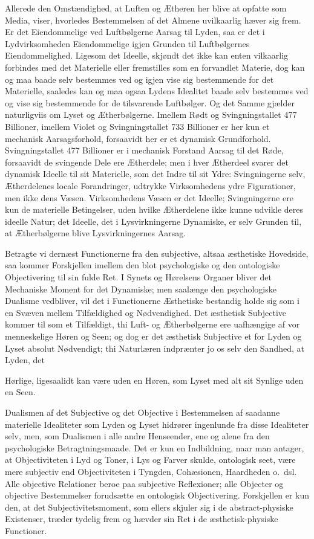 \documentclass[12pt]{book}
\newcommand{\opage}[1]{\marginnote{\footnotesize\textit{[#1]}}}
\begin{document}
Allerede den Omstændighed, at Luften og Ætheren her blive at opfatte som Media, viser,
hvorledes Bestemmelsen af det Almene uvilkaarlig hæver sig frem. Er det Eiendommelige ved
Luftbølgerne Aarsag til Lyden, saa er det i Lydvirksomheden Eiendommelige igjen Grunden til
Luftbølgernes
\opage{386} Eiendommelighed. Ligesom det Ideelle, skjøndt det ikke kan enten vilkaarlig forbindes med det
Materielle eller fremstilles som en forvandlet Materie, dog kan og maa baade selv bestemmes ved
og igjen vise sig bestemmende for det Materielle, saaledes kan og maa ogsaa Lydens Idealitet
baade selv bestemmes ved og vise sig bestemmende for de tilsvarende Luftbølger. Og det Samme
gjælder naturligviis om Lyset og Ætherbølgerne. Imellem Rødt og Svingningstallet 477 Billioner,
imellem Violet og Svingningstallet 733 Billioner er her kun et mechanisk Aarsagsforhold,
forsaavidt her er et dynamisk Grundforhold. Svingningstallet 477 Billioner er i mechanisk
Forstand Aarsag til det Røde, forsaavidt de svingende Dele ere Ætherdele; men i hver Ætherdeel
svarer det dynamisk Ideelle til sit Materielle, som det Indre til sit Ydre: Svingningerne selv,
Ætherdelenes locale Forandringer, udtrykke Virksomhedens ydre Figurationer, men ikke dens
Væsen. Virksomhedens Væsen er det Ideelle; Svingningerne ere kun de materielle Betingelser,
uden hvilke Ætherdelene ikke kunne udvikle deres ideelle Natur; det Ideelle, det i
Lysvirkningerne Dynamiske, er selv Grunden til, at Ætherbølgerne blive Lysvirkningernes Aarsag.

Betragte vi dernæst Functionerne fra den subjective, altsaa æsthetiske Hovedside, saa kommer
Forskjellen imellem den blot psychologiske og den ontologiske Objectivering til sin fulde Ret.
I Synets og Hørelsens Organer bliver det Mechaniske Moment for det Dynamiske; men saalænge den
psychologiske Dualisme vedbliver, vil det i Functionerne Æsthetiske bestandig holde sig som i en
Svæven mellem Tilfældighed og Nødvendighed. Det æsthetisk Subjective kommer til som et
Tilfældigt, thi Luft- og Ætherbølgerne ere uafhængige af vor menneskelige Høren og Seen; og dog
er det æsthetisk Subjective et for Lyden og Lyset absolut Nødvendigt; thi Naturlæren indprænter
jo os selv den Sandhed, at Lyden, det

\opage{387} Hørlige, ligesaalidt kan være uden en Høren, som Lyset med alt sit Synlige uden en Seen.

Dualismen af det Subjective og det Objective i Bestemmelsen af saadanne materielle Idealiteter
som Lyden og Lyset hidrører ingenlunde fra disse Idealiteter selv, men, som Dualismen i alle
andre Henseender, ene og alene fra den psychologiske Betragtningsmaade. Det er kun en
Indbildning, naar man antager, at Objectiviteten i Lyd og Toner, i Lys og Farver skulde,
ontologisk seet, være mere subjectiv end Objectiviteten i Tyngden, Cohæsionen, Haardheden
o.\ dsl. Alle objective Relationer beroe paa subjective Reflexioner; alle Objecter og objective
Bestemmelser forudsætte en ontologisk Objectivering. Forskjellen er kun den, at det
Subjectivitetsmoment, som ellers skjuler sig i de abstract-physiske Existenser, træder tydelig
frem og hævder sin Ret i de æsthetisk-physiske Functioner.
\end{document}
